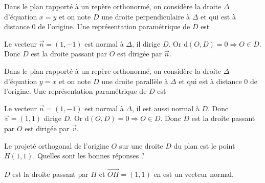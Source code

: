 \begin{question}
Dans le plan rapporté à un repère orthonormé, on considère la droite $\Delta$ d'équation $x=y$ et on note $D$ une droite perpendiculaire à $\Delta$ et qui est à distance $0$ de l'origine. Une représentation paramétrique de $D$ est
\begin{answers}  
\end{answers}
\begin{explanations}
Le vecteur $\vec{n}=(1,-1)$ est normal à $\Delta$, il dirige $D$. Or $\mbox{d}(O,D)=0\Rightarrow O\in D$. Donc $D$ est la droite passant par $O$ est dirigée par $\vec{n}$.
\end{explanations}
\end{question}


\begin{question}
Dans le plan rapporté à un repère orthonormé, on considère la droite $\Delta$ d'équation $y=x$ et on note $D$ une droite parallèle à $\Delta$ et qui est à distance $0$ de l'origine. Une représentation paramétrique de $D$ est
\begin{answers}  
\end{answers}
\begin{explanations}
Le vecteur $\vec{n}=(1,-1)$ est normal à $\Delta$, il est aussi normal à $D$. Donc $\vec{v}=(1,1)$ dirige $D$. Or $\mbox{d}(O,D)=0\Rightarrow O\in D$. Donc $D$ est la droite passant par $O$ est dirigée par $\vec{v}$.
\end{explanations}
\end{question}



\begin{question}
Le projeté orthogonal de l'origine $O$ sur une droite $D$ du plan est le point $H(1,1)$. Quelles sont les bonnes réponses ?
\begin{answers}  
\end{answers}
\begin{explanations}
$D$ est la droite passant par $H$ et $\overrightarrow{OH}=(1,1)$ en est un vecteur normal.
\end{explanations}
\end{question}

